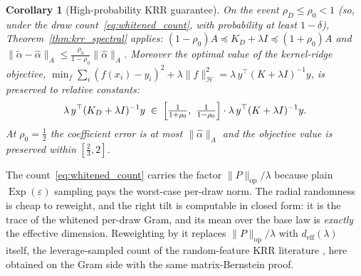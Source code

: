 \documentclass{article}
\newtheorem{corollary}[theorem]{Corollary}
\DeclareMathOperator{\Exp}{Exp}
\begin{document}
\begin{corollary}[High-probability KRR guarantee]\label{cor:krr_highprob}
On the event $\rho_D\le\rho_0<1$ (so, under the draw count~\eqref{eq:whitened_count}, with probability at least $1-\delta$), Theorem~\ref{thm:krr_spectral} applies: $(1-\rho_0)A\preceq K_D+\lambda I\preceq(1+\rho_0)A$ and $\|\tilde\alpha-\hat\alpha\|_A\le\tfrac{\rho_0}{1-\rho_0}\|\hat\alpha\|_A$. Moreover the optimal value of the kernel-ridge objective, $\min_f\sum_i(f(x_i)-y_i)^2+\lambda\|f\|_{\mathcal H}^2=\lambda\,y^\top(K+\lambda I)^{-1}y$, is preserved to relative constants:
\[
\lambda\,y^\top(K_D+\lambda I)^{-1}y\;\in\;\Bigl[\tfrac{1}{1+\rho_0},\ \tfrac{1}{1-\rho_0}\Bigr]\cdot\lambda\,y^\top(K+\lambda I)^{-1}y.
\]
At $\rho_0=\tfrac12$ the coefficient error is at most $\|\hat\alpha\|_A$ and the objective value is preserved within $[\tfrac23,2]$.
\end{corollary}

The count~\eqref{eq:whitened_count} carries the factor $\|P\|_{\mathrm{op}}/\lambda$ because plain $\Exp(\varepsilon)$ sampling pays the worst-case per-draw norm. The radial randomness is cheap to reweight, and the right tilt is computable in closed form: it is the trace of the whitened per-draw Gram, and its mean over the base law is \emph{exactly} the effective dimension. Reweighting by it replaces $\|P\|_{\mathrm{op}}/\lambda$ with $d_{\mathrm{eff}}(\lambda)$ itself, the leverage-sampled count of the random-feature KRR literature \citep{avron2017random,li2021unified}, here obtained on the Gram side with the same matrix-Bernstein proof.
\end{document}
